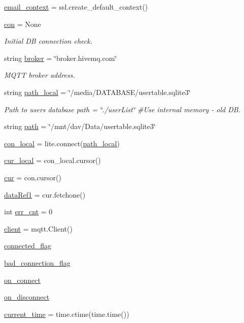 \begin{DoxyCompactItemize}
\hyperlink{namespace_s_q_lfunction_a7ec226cfeab195de604b38e8c7b2d0eb}{email\+\_\+context} = ssl.\+create\+\_\+default\+\_\+context()
\item 
\hyperlink{namespace_s_q_lfunction_a02e42e3457dfb29a0ee1b6252484b0e7}{con} = None
\begin{DoxyCompactList}\small\item\em Initial DB connection check. \end{DoxyCompactList}\item 
string \hyperlink{namespace_s_q_lfunction_aed5ec64d305ca004c4fe54d51dd36a4e}{broker} = \char`\"{}broker.\+hivemq.\+com\char`\"{}
\begin{DoxyCompactList}\small\item\em M\+Q\+TT broker address. \end{DoxyCompactList}\item 
string \hyperlink{namespace_s_q_lfunction_a50744e6ca7c6cbd547746acb907f016e}{path\+\_\+local} = \char`\"{}/media/D\+A\+T\+A\+B\+A\+SE/usertable.\+sqlite3\char`\"{}
\begin{DoxyCompactList}\small\item\em Path to users database path = \char`\"{}./user\+List\char`\"{} \#\+Use internal memory -\/ old DB. \end{DoxyCompactList}\item 
string \hyperlink{namespace_s_q_lfunction_a9239421845b9e0921bad7a2a191f3849}{path} = \char`\"{}/mnt/dav/Data/usertable.\+sqlite3\char`\"{}
\item 
\hyperlink{namespace_s_q_lfunction_af6ef43cf2e7be28e6205af9b355e4943}{con\+\_\+local} = lite.\+connect(\hyperlink{namespace_s_q_lfunction_a50744e6ca7c6cbd547746acb907f016e}{path\+\_\+local})
\item 
\hyperlink{namespace_s_q_lfunction_a808a7ba686f9086b3d4ef7d6a969aceb}{cur\+\_\+local} = con\+\_\+local.\+cursor()
\item 
\hyperlink{namespace_s_q_lfunction_aefa03c2c2ce5f2ab923453e1af7a2201}{cur} = con.\+cursor()
\item 
\hyperlink{namespace_s_q_lfunction_aab5e54d1ed091926790df37c8098f1f7}{data\+Ref1} = cur.\+fetchone()
\item 
int \hyperlink{namespace_s_q_lfunction_a5964aea00837148a0d731102edf6ac5c}{err\+\_\+cnt} = 0
\item 
\hyperlink{namespace_s_q_lfunction_ac9fb782d6f6dcc44fd19ea1b135ab996}{client} = mqtt.\+Client()
\item 
\hyperlink{namespace_s_q_lfunction_a513a0e7846b861b6982a0449f46cb6a8}{connected\+\_\+flag}
\item 
\hyperlink{namespace_s_q_lfunction_abffdbb58f2363e73ea86ddc83a3893ad}{bad\+\_\+connection\+\_\+flag}
\item 
\hyperlink{namespace_s_q_lfunction_a215e7090f82fbf0d31fd97be6721389a}{on\+\_\+connect}
\item 
\hyperlink{namespace_s_q_lfunction_ab3031ccbbdb3f5a04bd7d66ceb4494c7}{on\+\_\+disconnect}
\item 
\hyperlink{namespace_s_q_lfunction_affebcb967a2b844a9e7542f181deacb6}{current\+\_\+time} = time.\+ctime(time.\+time())
\end{DoxyCompactItemize}


